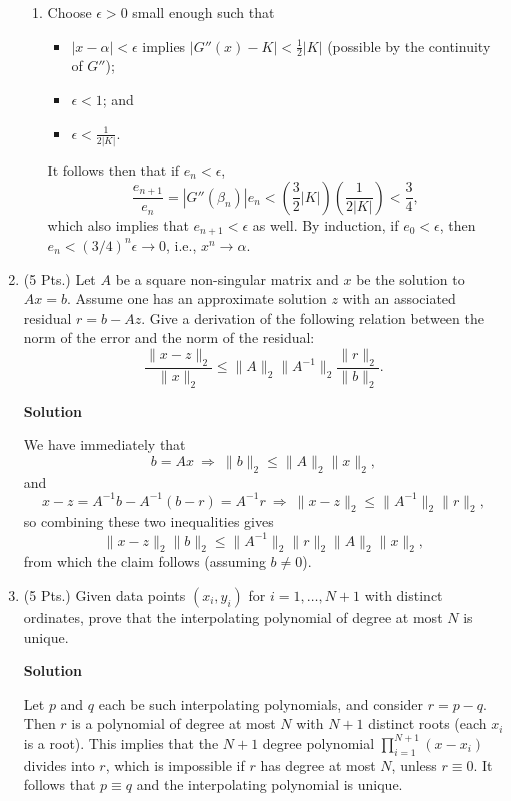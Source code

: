 \documentclass{article}
\begin{document}
\begin{enumerate}
\begin{enumerate}
\item Choose \(\epsilon > 0\) small enough such that
\begin{itemize}
\item \(|x - \alpha| < \epsilon\) implies \(\left| G''(x) - K \right| < \frac{1}{2} |K|\) (possible by the continuity of \(G''\));
\item \(\epsilon < 1\); and
\item \(\epsilon < \frac{1}{2|K|}\).
\end{itemize}
It follows then that if \(e_n < \epsilon\),
\[\frac{e_{n + 1}}{e_n} = \left| G''(\beta_n) \right| e_n
                        < \left( \frac{3}{2} |K| \right) \left( \frac{1}{2|K|} \right)
                        < \frac{3}{4},\]
which also implies that \(e_{n + 1} < \epsilon\) as well.  By induction, if \(e_0 < \epsilon\), then \(e_n < (3/4)^n \epsilon \to 0\), i.e., \(x^n \to \alpha\).

\end{enumerate}



\item (5 Pts.) Let \(A\) be a square non-singular matrix and \(x\) be the solution to \(Ax = b\).  Assume one has an approximate solution \(z\) with an associated residual \(r = b - Az\).  Give a derivation of the following relation between the norm of the error and the norm of the residual:
\[\frac{\|x - z\|_2}{\|x\|_2} \leq \|A\|_2 \|A^{-1}\|_2 \frac{\|r\|_2}{\|b\|_2}.\]

{\bf Solution}

We have immediately that
\[b = Ax \ \Rightarrow \ \|b\|_2 \leq \|A\|_2 \|x\|_2,\]
and
\[x - z = A^{-1}b - A^{-1}(b - r) = A^{-1} r \ \Rightarrow \ \|x - z\|_2 \leq \|A^{-1}\|_2 \|r\|_2,\]
so combining these two inequalities gives
\[\|x - z\|_2 \|b\|_2 \leq \|A^{-1}\|_2 \|r\|_2 \|A\|_2 \|x\|_2,\]
from which the claim follows (assuming \(b \neq 0\)).



\item (5 Pts.) Given data points \((x_i,y_i)\) for \(i = 1, \ldots, N + 1\) with distinct ordinates, prove that the interpolating polynomial of degree at most \(N\) is unique.

{\bf Solution}

Let \(p\) and \(q\) each be such interpolating polynomials, and consider \(r = p - q\).  Then \(r\) is a polynomial of degree at most \(N\) with \(N + 1\) distinct roots (each \(x_i\) is a root).  This implies that the \(N + 1\) degree polynomial \(\prod_{i = 1}^{N + 1} (x - x_i)\) divides into \(r\), which is impossible if \(r\) has degree at most \(N\), unless \(r \equiv 0\).  It follows that \(p \equiv q\) and the interpolating polynomial is unique.




\end{enumerate}
\end{document}
